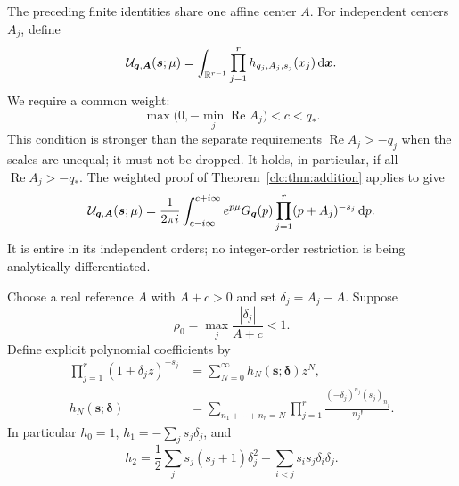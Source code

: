 \documentclass[11pt,a4paper]{article}
\numberwithin{equation}{section}
\theoremstyle{definition}\newtheorem{definition}[theorem]{Definition}
\theoremstyle{remark}\newtheorem{remark}[theorem]{Remark}
\DeclareMathOperator{\Rea}{Re}
\newcommand{\dd}{\,\mathrm d}
\newcommand{\bq}{\boldsymbol q}\newcommand{\bs}{\boldsymbol s}
\newcommand{\bA}{\boldsymbol A}\newcommand{\bdelta}{\boldsymbol\delta}
\begin{document}
The preceding finite identities share one affine center $A$.
For independent centers $A_j$, define
\begin{equation}\label{clc:eq:U}
 \UU_{\bq,\bA}(\bs;\mu)=
 \int_{\R^{r-1}}\prod_{j=1}^r h_{q_j,A_j,s_j}(x_j)
             \dd\boldsymbol x.
\end{equation}
We require a common weight:
\begin{equation}\label{clc:eq:unequal-strip}
 \max\bigl(0,-\min_j\Rea A_j\bigr)<c<q_*.
\end{equation}
This condition is stronger than the separate requirements
$\Rea A_j>-q_j$ when the scales are unequal; it must not be dropped.
It holds, in particular, if all $\Rea A_j>-q_*$.
The weighted proof of Theorem~\ref{clc:thm:addition} applies to give
\begin{equation}\label{clc:eq:U-contour}
 \UU_{\bq,\bA}(\bs;\mu)=\frac1{2\pi i}
 \int_{c-i\infty}^{c+i\infty}e^{p\mu}G_{\bq}(p)
                \prod_{j=1}^r(p+A_j)^{-s_j}\dd p.
\end{equation}
It is entire in its independent orders; no integer-order restriction is
being analytically differentiated.

Choose a real reference $A$ with $A+c>0$ and set $\delta_j=A_j-A$.
Suppose
\begin{equation}\label{clc:eq:rho-condition}
 \rho_0=\max_j\frac{|\delta_j|}{A+c}<1.
\end{equation}
Define explicit polynomial coefficients by
\begin{align}
 \prod_{j=1}^r(1+\delta_jz)^{-s_j}
   &=\sum_{N=0}^\infty h_N(\bs;\bdelta)z^N,\label{clc:eq:hN-gen}\\
 h_N(\bs;\bdelta)
   &=\sum_{n_1+\cdots+n_r=N}
       \prod_{j=1}^r\frac{(-\delta_j)^{n_j}(s_j)_{n_j}}{n_j!}.
 \label{clc:eq:hN}
\end{align}
In particular $h_0=1$, $h_1=-\sum_js_j\delta_j$, and
\[
 h_2=\frac12\sum_js_j(s_j+1)\delta_j^2
                 +\sum_{i<j}s_is_j\delta_i\delta_j.
\]
\end{document}
